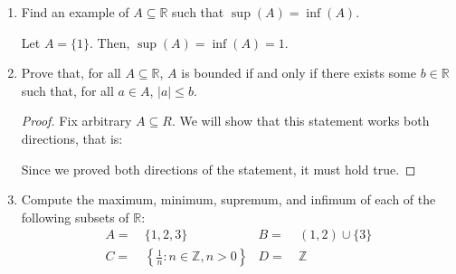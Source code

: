 \documentclass{article}
\begin{document}
\begin{enumerate}
    	\item Find an example of $A \subseteq \mathbb{R}$ such that $\sup(A) = \inf(A)$. \par
                \quad Let $A = \{ 1 \}$. Then, $\sup(A) = \inf(A) = 1$.

    	\item Prove that, for all $A \subseteq \mathbb{R}$, $A$ is bounded if and only if there exists some $b \in \mathbb{R}$ such that, for all $a \in A$, $|a| \leq b$.
                \begin{proof}
                    Fix arbitrary $A \subseteq R$. We will show that this statement works both directions, that is:
                    \begin{caseof}
                    \end{caseof}
                    Since we proved both directions of the statement, it must hold true.
                \end{proof}

    	\item Compute the maximum, minimum, supremum, and infimum of each of the following subsets of $\mathbb{R}$:
    		\begin{align*}
    			A = & \ \{ 1, 2, 3 \} & B = & \ (1, 2) \cup \{ 3 \} \\
    			C = & \ \left\{ \frac{1}{n} : n \in \mathbb{Z}, n > 0 \right\} & D = & \ \mathbb{Z}
    		\end{align*}


\end{enumerate}
\end{document}
